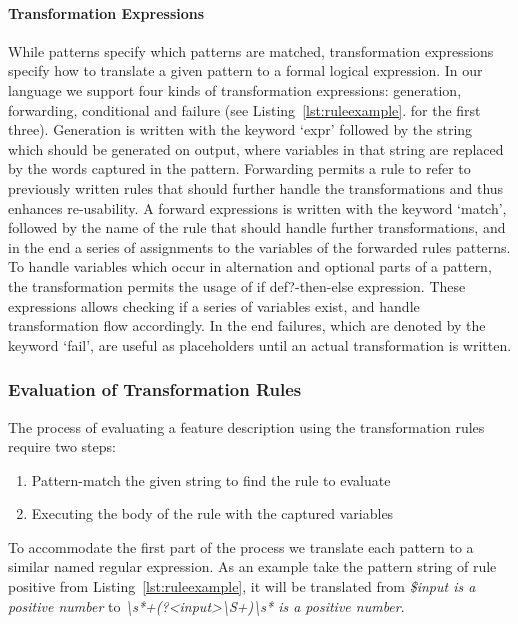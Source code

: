 \paragraph{Transformation Expressions}
\label{par:Transformation Expressions}
While patterns specify which patterns are matched, transformation expressions
specify how to translate a given pattern to a formal logical expression.
In our language we support four kinds of transformation expressions:
generation, forwarding, conditional and failure (see Listing~\ref{lst:ruleexample}. for the first three).
Generation is written with the keyword `expr'
followed by the string which should be generated on output, where variables
in that string are replaced by the words captured in the pattern.
Forwarding permits a rule to refer to previously written rules that should further handle the
transformations and thus enhances re-usability.
A forward expressions is written with the keyword `match',
followed by the name of the rule that should handle further transformations,
and in the end a series of assignments to the variables of the forwarded
rules patterns.
To handle variables which occur in alternation and optional parts of a
pattern, the transformation permits the usage of if def?-then-else expression.
These expressions allows checking if a series of variables exist,
and handle transformation flow accordingly.
In the end failures, which are denoted by the keyword `fail',
are useful as placeholders until an actual transformation is written.

\subsubsection{Evaluation of Transformation Rules}
\label{sub:Evaluation of Transformation Rules}

The process of evaluating a feature description using the transformation rules require two steps:
\begin{enumerate}
  \item Pattern-match the given string to find the rule to evaluate
  \item Executing the body of the rule with the captured variables
\end{enumerate}
To accommodate the first part of the process we translate each pattern to a
similar named regular expression. As an example take the pattern string of rule positive from Listing~\ref{lst:ruleexample}, it will be translated 
from \textit{\$input is a positive number} to \textit{\textbackslash s*+(?\textless input\textgreater\textbackslash S+)\textbackslash s* is a positive number}.

